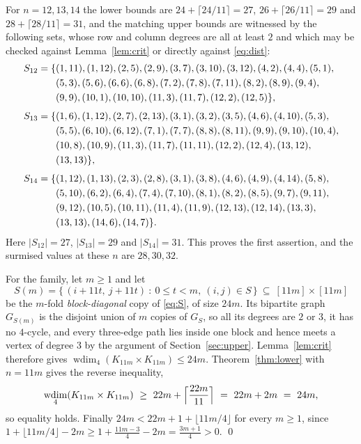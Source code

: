 \documentclass[11pt]{amsart}
\theoremstyle{remark}
\DeclareMathOperator{\wdim}{wdim}
\begin{document}
For $n=12,13,14$ the lower bounds are
$24+\lceil24/11\rceil=27$, $26+\lceil26/11\rceil=29$ and
$28+\lceil28/11\rceil=31$, and the matching upper bounds are witnessed by the
following sets, whose row and column degrees are all at least $2$ and which may
be checked against Lemma~\ref{lem:crit} or directly against
\eqref{eq:dist}:
\begin{align}
 S_{12}=\{&(1,11),(1,12),(2,5),(2,9),(3,7),(3,10),(3,12),(4,2),(4,4),(5,1),\notag\\
          &(5,3),(5,6),(6,6),(6,8),(7,2),(7,8),(7,11),(8,2),(8,9),(9,4),\notag\\
          &(9,9),(10,1),(10,10),(11,3),(11,7),(12,2),(12,5)\},\label{eq:S12}\\[4pt]
 S_{13}=\{&(1,6),(1,12),(2,7),(2,13),(3,1),(3,2),(3,5),(4,6),(4,10),(5,3),\notag\\
          &(5,5),(6,10),(6,12),(7,1),(7,7),(8,8),(8,11),(9,9),(9,10),(10,4),\notag\\
          &(10,8),(10,9),(11,3),(11,7),(11,11),(12,2),(12,4),(13,12),\notag\\
          &(13,13)\},\label{eq:S13}\\[4pt]
 S_{14}=\{&(1,12),(1,13),(2,3),(2,8),(3,1),(3,8),(4,6),(4,9),(4,14),(5,8),\notag\\
          &(5,10),(6,2),(6,4),(7,4),(7,10),(8,1),(8,2),(8,5),(9,7),(9,11),\notag\\
          &(9,12),(10,5),(10,11),(11,4),(11,9),(12,13),(12,14),(13,3),\notag\\
          &(13,13),(14,6),(14,7)\}.\label{eq:S14}
\end{align}
Here $\lvert S_{12}\rvert=27$, $\lvert S_{13}\rvert=29$ and
$\lvert S_{14}\rvert=31$. This proves the first assertion, and the surmised
values at these $n$ are $28,30,32$.

For the family, let $m\ge1$ and let
\[
  S(m)=\bigl\{\,(i+11t,\ j+11t)\ :\ 0\le t<m,\ (i,j)\in S\,\bigr\}
  \ \subseteq\ [11m]\times[11m]
\]
be the $m$-fold \emph{block-diagonal} copy of \eqref{eq:S}, of size
$24m$. Its bipartite graph $G_{S(m)}$ is the disjoint union of $m$ copies of
$G_S$, so all its degrees are $2$ or $3$, it has no $4$-cycle, and every
three-edge path lies inside one block and hence meets a vertex of degree $3$ by
the argument of Section~\ref{sec:upper}. Lemma~\ref{lem:crit} therefore gives
$\wdim_4(K_{11m}\times K_{11m})\le24m$. Theorem~\ref{thm:lower} with
$n=11m$ gives the reverse inequality,
\[
  \wdim_4(K_{11m}\times K_{11m})\ \ge\ 22m+\Bigl\lceil\frac{22m}{11}\Bigr\rceil
  \ =\ 22m+2m\ =\ 24m ,
\]
so equality holds. Finally $24m<22m+1+\lfloor11m/4\rfloor$ for every $m\ge1$,
since $1+\lfloor11m/4\rfloor-2m\ge1+\frac{11m-3}{4}-2m=\frac{3m+1}{4}>0$. \qed
\end{document}

